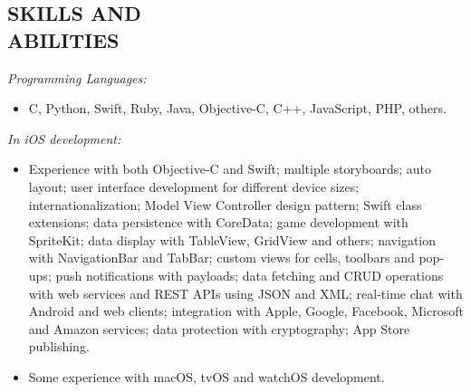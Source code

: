 \documentclass[margin]{res}
\begin{document}
\begin{resume}
		\section{SKILLS AND \\ABILITIES}
			{\sl Programming Languages:}
			\begin{itemize}
	 			\item[] C, Python, Swift, Ruby, Java, Objective-C, C++, JavaScript, PHP, others.
	  		\end{itemize}
			{\sl In iOS development:}
			\begin{itemize}
				\item [] Experience with both Objective-C and Swift; multiple storyboards; auto layout; user interface development for different device sizes; internationalization; Model View Controller design pattern; Swift class extensions; data persistence with CoreData; game development with SpriteKit; data display with TableView, GridView and others; navigation with NavigationBar and TabBar; custom views for cells, toolbars and pop-ups; push notifications with payloads; data fetching and CRUD operations with web services and REST APIs using JSON and XML; real-time chat with Android and web clients; integration with Apple, Google, Facebook, Microsoft and Amazon services; data protection with cryptography; App Store publishing.
				\item [] Some experience with macOS, tvOS and watchOS development.
	  		\end{itemize}

\end{resume}
\end{document}
